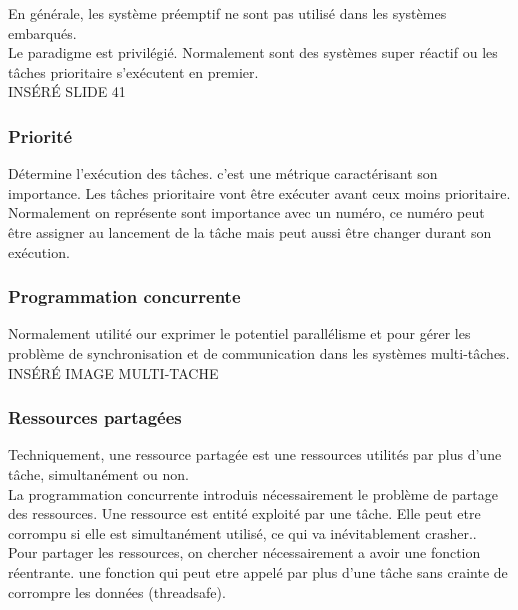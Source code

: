 \documentclass[oneside]{book}
\begin{document}
    En générale, les système préemptif ne sont pas utilisé dans les systèmes embarqués.\\
    
    Le paradigme est privilégié. Normalement sont des systèmes super réactif ou les tâches prioritaire s'exécutent en premier.\\
    
    
    INSÉRÉ SLIDE 41
    
    \subsubsection{Priorité}
    Détermine l'exécution des tâches. c'est une métrique caractérisant son importance. Les tâches prioritaire vont être exécuter avant ceux moins prioritaire. Normalement on représente sont importance avec un numéro, ce numéro peut être assigner au lancement de la tâche mais peut aussi être changer durant son exécution.\\
    
    
    
    \subsubsection{Programmation concurrente}
    Normalement utilité our exprimer le potentiel parallélisme et pour gérer les problème de synchronisation et de communication dans les systèmes multi-tâches.\\
    
    INSÉRÉ IMAGE MULTI-TACHE\\
    
    \subsubsection{Ressources partagées}
    Techniquement, une ressource partagée est une ressources utilités par plus d'une tâche, simultanément ou non.\\
    
    
    La programmation concurrente introduis nécessairement le problème de partage des ressources. Une ressource est entité exploité par une tâche. Elle peut etre corrompu si elle est simultanément utilisé, ce qui va inévitablement crasher.. \\
    
    Pour partager les ressources, on chercher nécessairement a avoir une fonction réentrante. une fonction qui peut etre appelé par plus d'une tâche sans crainte de corrompre les données (threadsafe).\\
    
\end{document}
